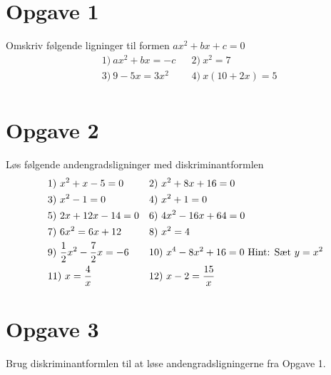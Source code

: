 \section*{Opgave 1}
Omskriv følgende ligninger til formen $ax^2+bx+c = 0$
\begin{align*}
&1) \ ax^2+bx = -c   &&2) \  x^2=7  \\
&3) \ 9-5x=3x^2   &&4) \ x(10+2x)=5   \\
\end{align*}
\section*{Opgave 2}
Løs følgende andengradsligninger med diskriminantformlen
\begin{align*}
&1) \ x^2+x-5 =0   &&2) \  x^2+8x+16 = 0  \\
&3) \ x^2-1 = 0  &&4) \ x^2+1=0  \\
&5) \ 2x+12x-14=0 &&6) \  4x^2-16x+64=0   \\
&7) \  6x^2=6x+12  &&8) \  x^2=4  \\
&9) \  \frac{1}{2}x^2 -\frac{7}{2}x=-6  &&10) \ x^4 - 8x^2+16 =0 \textnormal{ Hint: Sæt } y=x^2   \\
&11) \  x = \frac{4}{x}  && 12) \    x-2 = \frac{15}{x}   
\end{align*}


\section*{Opgave 3}
Brug diskriminantformlen til at løse andengradsligningerne fra Opgave 1.
